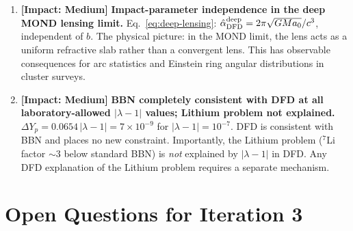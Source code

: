 \documentclass[11pt]{article}
\newcommand{\ee}[1]{\times 10^{#1}}
\newcommand{\lambdaone}{|\lambda-1|}
\begin{document}
\begin{enumerate}
\item \textbf{[Impact: Medium]} \textbf{Impact-parameter independence in
the deep MOND lensing limit.}
Eq.~\eqref{eq:deep-lensing}: $\hat\alpha_{\rm DFD}^{\rm deep}
= 2\pi\sqrt{GMa_0}/c^3$, independent of $b$.  The physical picture:
in the MOND limit, the lens acts as a uniform refractive slab rather
than a convergent lens.  This has observable consequences for arc
statistics and Einstein ring angular distributions in cluster surveys.

\item \textbf{[Impact: Medium]} \textbf{BBN completely consistent with
DFD at all laboratory-allowed $\lambdaone$ values; Lithium problem
not explained.}
$\Delta Y_p = 0.0654\,\lambdaone = 7\ee{-9}$ for $\lambdaone = 10^{-7}$.
DFD is consistent with BBN and places no new constraint.  Importantly,
the Lithium problem ($^7$Li factor $\sim 3$ below standard BBN)
is \emph{not} explained by $\lambdaone$ in DFD.  Any DFD explanation
of the Lithium problem requires a separate mechanism.

\end{enumerate}

\section{Open Questions for Iteration 3}
\label{sec:open-questions}
\end{document}
